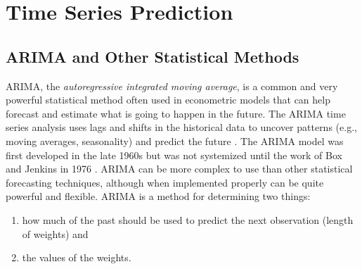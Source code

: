 \section{Time Series Prediction}
\vspace*{-\baselineskip}

\subsection{ARIMA and Other Statistical Methods}
ARIMA, the \emph{autoregressive integrated moving average}, is a common and very powerful statistical method often used in econometric models that can help forecast and estimate what is going to happen in the future.
The ARIMA time series analysis uses lags and shifts in the historical data to uncover patterns (e.g., moving averages, seasonality) and predict the future \cite{BoxJenkins:1994}.
The ARIMA model was first developed in the late 1960s but was not systemized until the work of Box and Jenkins in 1976 \cite{BoxJenkins:1976}.
ARIMA can be more complex to use than other statistical forecasting techniques, although when implemented properly can be quite powerful and flexible.  ARIMA is a method for determining two things:
\begin{enumerate}
\item how much of the past should be used to predict the next observation (length of weights) and
\item the values of the weights.
\end{enumerate}

